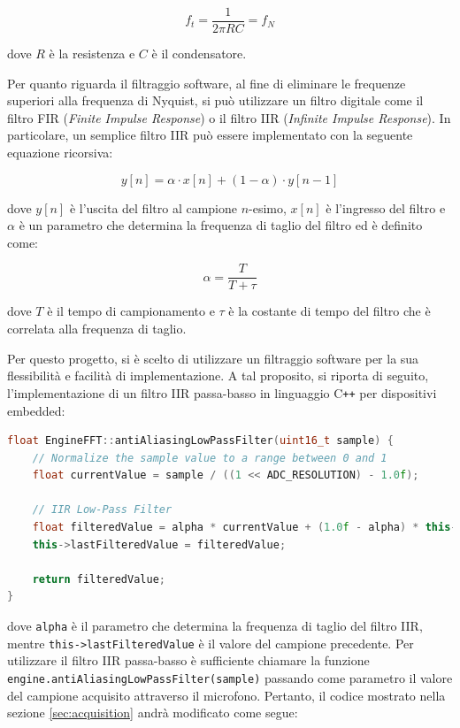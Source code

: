 \documentclass[a4paper,12pt]{report}  %
\newcommand{\lstinlinebg}[1]{\colorbox{backcolour}{\lstinline|#1|}}
\begin{document}
\begin{equation}
    f_t = \frac{1}{2 \pi R C} = f_N \nonumber
\end{equation}

dove $R$ è la resistenza e $C$ è il condensatore.

Per quanto riguarda il filtraggio software, al fine di eliminare le frequenze superiori alla frequenza di Nyquist, si può utilizzare un filtro digitale come il filtro FIR (\textit{Finite Impulse Response}) o il filtro IIR (\textit{Infinite Impulse Response}).
In particolare, un semplice filtro IIR può essere implementato con la seguente equazione ricorsiva:

\begin{equation}
    y[n] = \alpha \cdot x[n] + (1 - \alpha) \cdot y[n - 1] \nonumber
\end{equation}

dove $y[n]$ è l'uscita del filtro al campione $n$-esimo, $x[n]$ è l'ingresso del filtro e $\alpha$ è un parametro che determina la frequenza di taglio del filtro ed è definito come:

\begin{equation}
    \alpha = \frac{T}{T + \tau} \nonumber
\end{equation}

dove $T$ è il tempo di campionamento e $\tau$ è la costante di tempo del filtro che è correlata alla frequenza di taglio.

Per questo progetto, si è scelto di utilizzare un filtraggio software per la sua flessibilità e facilità di implementazione.
A tal proposito, si riporta di seguito, l'implementazione di un filtro IIR passa-basso in linguaggio C\texttt{++} per dispositivi embedded:

\begin{lstlisting}[language=C++,keywords={const, uint8_t, float, this, return, uint16_t, analogRead, println, delay}]
float EngineFFT::antiAliasingLowPassFilter(uint16_t sample) {
    // Normalize the sample value to a range between 0 and 1
    float currentValue = sample / ((1 << ADC_RESOLUTION) - 1.0f);
    
    // IIR Low-Pass Filter
    float filteredValue = alpha * currentValue + (1.0f - alpha) * this->lastFilteredValue;
    this->lastFilteredValue = filteredValue;
    
    return filteredValue;
}
\end{lstlisting}

dove \lstinlinebg{alpha} è il parametro che determina la frequenza di taglio del filtro IIR, mentre \lstinlinebg{this->lastFilteredValue} è il valore del campione precedente.
Per utilizzare il filtro IIR passa-basso è sufficiente chiamare la funzione \lstinlinebg{engine.antiAliasingLowPassFilter(sample)} passando come parametro il valore del campione acquisito attraverso il microfono.
Pertanto, il codice mostrato nella sezione \ref{sec:acquisition} andrà modificato come segue:
\end{document}
